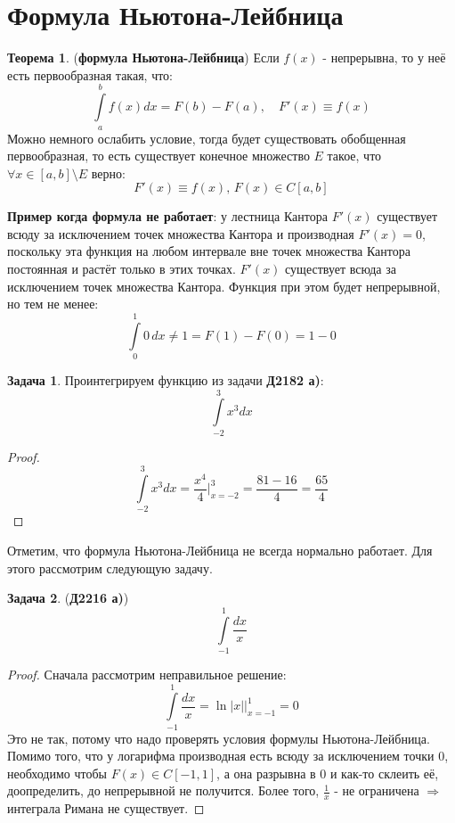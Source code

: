 \documentclass[12pt]{article}
\theoremstyle{definition}
\newtheorem{problem}{Задача}
\newtheorem{theorem}{Теорема}
\newcommand{\ddint}[2]{\displaystyle\int\limits_{#1}^{#2}}
\begin{document}
\section*{Формула Ньютона-Лейбница}

\begin{theorem}(\textbf{формула Ньютона-Лейбница})
	Если $f(x)$ - непрерывна, то у неё есть первообразная такая, что:
	$$
		\ddint{a}{b}f(x)dx = F(b) - F(a), \quad F'(x) \equiv f(x)
	$$
	Можно немного ослабить условие, тогда будет существовать обобщенная первообразная, то есть существует конечное множество $E$ такое, что $\forall x \in [a,b]\setminus E$ верно:
	$$
		F'(x) \equiv f(x), \, F(x) \in C[a,b]
	$$
\end{theorem}

\textbf{Пример когда формула не работает}: у лестница Кантора $F'(x)$ существует всюду за исключением точек множества Кантора и производная $F'(x) = 0$, поскольку эта функция на любом интервале вне точек множества Кантора постоянная и растёт только в этих точках. $F'(x)$ существует всюда за исключением точек множества Кантора. Функция при этом будет непрерывной, но тем не менее:
$$
	\ddint{0}{1}0\, dx \neq 1 = F(1) - F(0) = 1 - 0
$$

\begin{problem}
	Проинтегрируем функцию из задачи \textbf{Д2182 а)}:
	$$
		\ddint{-2}{3}x^3dx
	$$
\end{problem}
\begin{proof}
	$$
		\ddint{-2}{3}x^3dx = \dfrac{x^4}{4}\bigg|_{x = -2}^{3} = \dfrac{81 - 16}{4} = \dfrac{65}{4}
	$$
\end{proof}

Отметим, что формула Ньютона-Лейбница не всегда нормально работает. Для этого рассмотрим следующую задачу.
\begin{problem}(\textbf{Д2216 а)})
	$$
		\ddint{-1}{1}\dfrac{dx}{x}
	$$
\end{problem}
\begin{proof}
	Сначала рассмотрим неправильное решение:
	$$
		\ddint{-1}{1}\dfrac{dx}{x} = \ln{|x|}\bigg|_{x = -1}^{1} = 0
	$$
	Это не так, потому что надо проверять условия формулы Ньютона-Лейбница. Помимо того, что у логарифма производная есть всюду за исключением точки $0$, необходимо чтобы $F(x) \in C[-1,1]$, а она разрывна в $0$ и как-то склеить её, доопределить, до непрерывной не получится. Более того, $\tfrac{1}{x}$ - не ограничена $\Rightarrow$ интеграла Римана не существует.
\end{proof}
\end{document}
